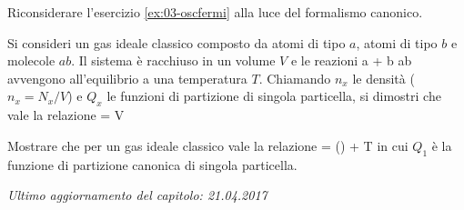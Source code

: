 \begin{Exercise}[title={Oscillatori di Fermi, la vendetta canonica},
label={ex:04-oscfermi}]
Riconsiderare l'esercizio \ref{ex:03-oscfermi} alla luce del formalismo canonico.
\end{Exercise}

\begin{Exercise}[title={Equilibrio chimico},label={ex:04-eqchim}]
Si consideri un gas ideale classico composto da atomi di tipo $a$, atomi di tipo $b$ e molecole $ab$. Il sistema è racchiuso in un volume $V$ e le reazioni
\be
a + b \rightleftharpoons ab
\ee
avvengono all'equilibrio a una temperatura $T$. Chiamando $n_x$ le densità ($n_x = N_x/V$) e $Q_x$ le funzioni di partizione di singola particella, si dimostri che vale la relazione
\be
{} = V
\ee
\end{Exercise}

\begin{Exercise}[title={Entropia di un gas ideale classico},label={ex:04-esps}]
Mostrare che per un gas ideale classico vale la relazione
\be
{} = \ln\left(\right) + T
\ee
in cui $Q_1$ è la funzione di partizione canonica di singola particella.
\end{Exercise}


\vskip 0.75cm
\begin{flushright}
{\em Ultimo aggiornamento del capitolo: 21.04.2017}
\end{flushright}

